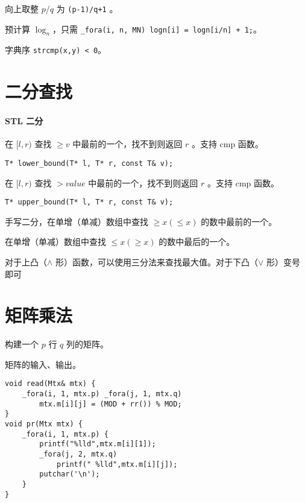 \documentclass{probook}
\begin{document}
\begin{multicols}{2}
向上取整 $p/q$ 为 \lstinline[style=cpp]{(p-1)/q+1} 。

预计算 $\log_n$，只需 \lstinline[style=cpp]{_fora(i, n, MN) logn[i] = logn[i/n] + 1;}。

字典序 \lstinline[style=cpp]{strcmp(x,y) < 0}。

\section{二分查找}

\paragraph*{STL 二分}

在 $[l,r)$ 查找 $\geqslant v$ 中最前的一个，找不到则返回 $r$ 。支持 cmp 函数。

\begin{lstlisting}[style=cpp]
T* lower_bound(T* l, T* r, const T& v);
\end{lstlisting}

在 $[l,r)$ 查找 $> value$ 中最前的一个，找不到则返回 $r$ 。支持 cmp 函数。

\begin{lstlisting}[style=cpp]
T* upper_bound(T* l, T* r, const T& v);
\end{lstlisting}

手写二分，在单增（单减）数组中查找 $\geqslant x(\leqslant x)$ 的数中最前的一个。



在单增（单减）数组中查找 $\leqslant x(\geqslant x)$ 的数中最后的一个。



对于上凸（$\wedge$ 形）函数，可以使用三分法来查找最大值。对于下凸（$\vee$ 形）变号即可



\section{矩阵乘法}

构建一个 $p$ 行 $q$ 列的矩阵。



矩阵的输入、输出。

\begin{lstlisting}[style=cpp]
void read(Mtx& mtx) {
    _fora(i, 1, mtx.p) _fora(j, 1, mtx.q)
        mtx.m[i][j] = (MOD + rr()) % MOD;
}
void pr(Mtx mtx) {
    _fora(i, 1, mtx.p) {
        printf("%lld",mtx.m[i][1]);
        _fora(j, 2, mtx.q)
            printf(" %lld",mtx.m[i][j]);
        putchar('\n');
    }
}
\end{lstlisting}


\end{multicols}
\end{document}
